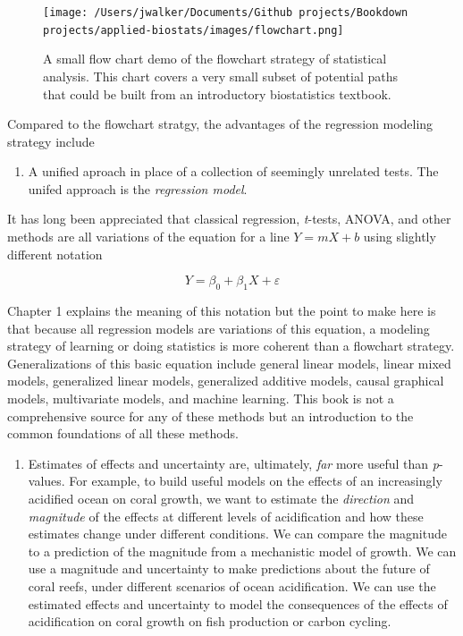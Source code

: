 \documentclass[]{book}
\providecommand{\tightlist}{%
  \setlength{\itemsep}{0pt}\setlength{\parskip}{0pt}}
\begin{document}
\begin{figure}
\centering
\texttt{[image: /Users/jwalker/Documents/Github projects/Bookdown projects/applied-biostats/images/flowchart.png]}
\caption{\label{fig:flowchart}A small flow chart demo of the flowchart strategy of statistical analysis. This chart covers a very small subset of potential paths that could be built from an introductory biostatistics textbook.}
\end{figure}

Compared to the flowchart stratgy, the advantages of the regression modeling strategy include

\begin{enumerate}
\def\labelenumi{\arabic{enumi}.}
\tightlist
\item
  A unified aproach in place of a collection of seemingly unrelated tests. The unifed approach is the \emph{regression model}.
\end{enumerate}

It has long been appreciated that classical regression, \emph{t}-tests, ANOVA, and other methods are all variations of the equation for a line \(Y = mX + b\) using slightly different notation

\begin{equation}
Y = \beta_0 + \beta_1 X + \varepsilon
\end{equation}

Chapter 1 explains the meaning of this notation but the point to make here is that because all regression models are variations of this equation, a modeling strategy of learning or doing statistics is more coherent than a flowchart strategy. Generalizations of this basic equation include general linear models, linear mixed models, generalized linear models, generalized additive models, causal graphical models, multivariate models, and machine learning. This book is not a comprehensive source for any of these methods but an introduction to the common foundations of all these methods.

\begin{enumerate}
\def\labelenumi{\arabic{enumi}.}
\setcounter{enumi}{1}
\tightlist
\item
  Estimates of effects and uncertainty are, ultimately, \emph{far} more useful than \emph{p}-values. For example, to build useful models on the effects of an increasingly acidified ocean on coral growth, we want to estimate the \emph{direction} and \emph{magnitude} of the effects at different levels of acidification and how these estimates change under different conditions. We can compare the magnitude to a prediction of the magnitude from a mechanistic model of growth. We can use a magnitude and uncertainty to make predictions about the future of coral reefs, under different scenarios of ocean acidification. We can use the estimated effects and uncertainty to model the consequences of the effects of acidification on coral growth on fish production or carbon cycling.
\end{enumerate}
\end{document}
